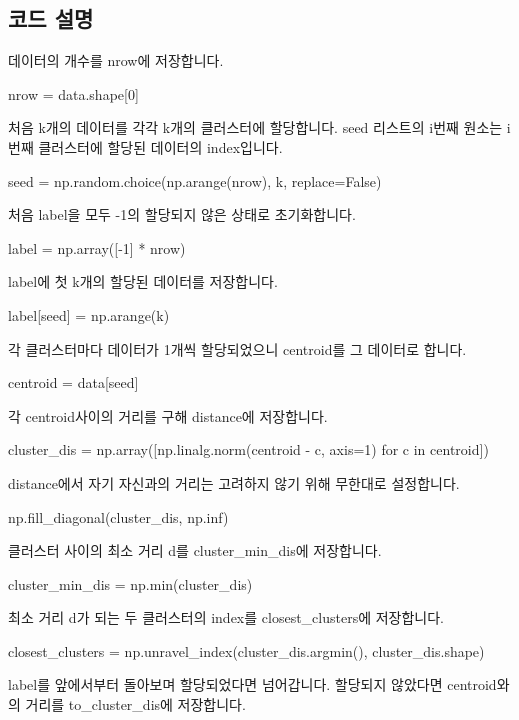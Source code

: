 \documentclass{oblivoir}
\begin{document}
  \subsection{코드 설명}
  데이터의 개수를 nrow에 저장합니다.
  \begin{python}[label={GPS_clustering_15}]
    nrow = data.shape[0]
  \end{python}
  처음 k개의 데이터를 각각 k개의 클러스터에 할당합니다. 
  seed 리스트의 i번째 원소는 i번째 클러스터에 할당된 데이터의 index입니다.
  \begin{python}[label={GPS_clustering_16}]
    seed = np.random.choice(np.arange(nrow), k, replace=False)
  \end{python}
  처음 label을 모두 -1의 할당되지 않은 상태로 초기화합니다.
  \begin{python}[label={GPS_clustering_17}]
    label = np.array([-1] * nrow)
  \end{python}
  label에 첫 k개의 할당된 데이터를 저장합니다.
  \begin{python}[label={GPS_clustering_18}]
    label[seed] = np.arange(k)
  \end{python}
  각 클러스터마다 데이터가 1개씩 할당되었으니 centroid를 그 데이터로 합니다.
  \begin{python}[label={GPS_clustering_19}]
    centroid = data[seed]
  \end{python}
  각 centroid사이의 거리를 구해 distance에 저장합니다.
  \begin{python}[label={GPS_clustering_20}]
    cluster_dis = np.array([np.linalg.norm(centroid - c, axis=1) for c in centroid])
  \end{python}
  distance에서 자기 자신과의 거리는 고려하지 않기 위해 무한대로 설정합니다.
  \begin{python}[label={GPS_clustering_21}]
    np.fill_diagonal(cluster_dis, np.inf)
  \end{python}
  클러스터 사이의 최소 거리 d를 cluster\_min\_dis에 저장합니다.
  \begin{python}[label={GPS_clustering_22}]
    cluster_min_dis = np.min(cluster_dis)
  \end{python}
  최소 거리 d가 되는 두 클러스터의 index를 closest\_clusters에 저장합니다.
  \begin{python}[label={GPS_clustering_23}]
    closest_clusters = np.unravel_index(cluster_dis.argmin(), cluster_dis.shape)
  \end{python}
  label를 앞에서부터 돌아보며 할당되었다면 넘어갑니다.
  할당되지 않았다면 centroid와의 거리를 to\_cluster\_dis에 저장합니다.
\end{document}
